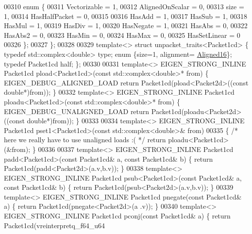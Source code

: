 \begin{DoxyCode}
00310   \textcolor{keyword}{enum} \{
00311     Vectorizable = 1,
00312     AlignedOnScalar = 0,
00313     size = 1,
00314     HasHalfPacket = 0,
00315 
00316     HasAdd    = 1,
00317     HasSub    = 1,
00318     HasMul    = 1,
00319     HasDiv    = 1,
00320     HasNegate = 1,
00321     HasAbs    = 0,
00322     HasAbs2   = 0,
00323     HasMin    = 0,
00324     HasMax    = 0,
00325     HasSetLinear = 0
00326   \};
00327 \};
00328 
00329 \textcolor{keyword}{template}<> \textcolor{keyword}{struct }unpacket\_traits<Packet1cd> \{ \textcolor{keyword}{typedef} std::complex<double> type; \textcolor{keyword}{enum} \{size=1, alignment=
      \hyperlink{group__enums_gga45fe06e29902b7a2773de05ba27b47a1af8e2bf74b04c02199f62c5e3c06dbfcc}{Aligned16}\}; \textcolor{keyword}{typedef} Packet1cd half; \};
00330 
00331 \textcolor{keyword}{template}<> EIGEN\_STRONG\_INLINE Packet1cd pload<Packet1cd>(\textcolor{keyword}{const} std::complex<double>* from) \{ 
      EIGEN\_DEBUG\_ALIGNED\_LOAD \textcolor{keywordflow}{return} Packet1cd(pload<Packet2d>((\textcolor{keyword}{const} \textcolor{keywordtype}{double}*)from)); \}
00332 \textcolor{keyword}{template}<> EIGEN\_STRONG\_INLINE Packet1cd ploadu<Packet1cd>(\textcolor{keyword}{const} std::complex<double>* from) \{ 
      EIGEN\_DEBUG\_UNALIGNED\_LOAD \textcolor{keywordflow}{return} Packet1cd(ploadu<Packet2d>((\textcolor{keyword}{const} \textcolor{keywordtype}{double}*)from)); \}
00333 
00334 \textcolor{keyword}{template}<> EIGEN\_STRONG\_INLINE Packet1cd pset1<Packet1cd>(\textcolor{keyword}{const} std::complex<double>&  from)
00335 \{ \textcolor{comment}{/* here we really have to use unaligned loads :( */} \textcolor{keywordflow}{return} ploadu<Packet1cd>(&from); \}
00336 
00337 \textcolor{keyword}{template}<> EIGEN\_STRONG\_INLINE Packet1cd padd<Packet1cd>(\textcolor{keyword}{const} Packet1cd& a, \textcolor{keyword}{const} Packet1cd& b) \{ \textcolor{keywordflow}{return} 
      Packet1cd(padd<Packet2d>(a.v,b.v)); \}
00338 \textcolor{keyword}{template}<> EIGEN\_STRONG\_INLINE Packet1cd psub<Packet1cd>(\textcolor{keyword}{const} Packet1cd& a, \textcolor{keyword}{const} Packet1cd& b) \{ \textcolor{keywordflow}{return} 
      Packet1cd(psub<Packet2d>(a.v,b.v)); \}
00339 \textcolor{keyword}{template}<> EIGEN\_STRONG\_INLINE Packet1cd pnegate(\textcolor{keyword}{const} Packet1cd& a) \{ \textcolor{keywordflow}{return} Packet1cd(pnegate<Packet2d>(a
      .v)); \}
00340 \textcolor{keyword}{template}<> EIGEN\_STRONG\_INLINE Packet1cd pconj(\textcolor{keyword}{const} Packet1cd& a) \{ \textcolor{keywordflow}{return} Packet1cd(vreinterpretq\_f64\_u64

\end{DoxyCode}
